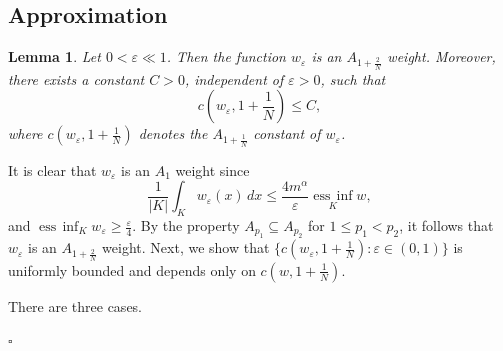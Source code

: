 \documentclass[11pt]{article}
\newtheorem{lemma}{Lemma}[section]
\newenvironment{proof}{{\bf {Proof.}}}{\hfill $\square$}
\numberwithin{equation}{section}
\def\bf{\textbf}
\def\essinf{\operatorname*{ess\ \! inf}}
\begin{document}
 \subsection{Approximation}



 \begin{lemma}\label{01.18.L1}
Let $0 < \varepsilon \ll 1$. Then the function $w_\varepsilon$ is an $A_{1+\frac{2}{N}}$ weight. Moreover, there exists a constant $C > 0$, independent of $\varepsilon > 0$, such that
\begin{equation*}
c\left(w_\varepsilon, 1+\frac{1}{N}\right) \leq C,
\end{equation*}
where $c(w_\varepsilon, 1+\frac{1}{N})$ denotes the $A_{1+\frac{1}{N}}$ constant of $w_\varepsilon$.
\end{lemma}
\begin{proof}
It is clear that $w_\varepsilon$ is an $A_1$ weight since
\begin{equation*}
\frac{1}{|K|}\int_K w_\varepsilon(x) \, dx \leq \frac{4m^\alpha}{\varepsilon} \essinf_K w,
\end{equation*}
and $\essinf_K w_\varepsilon \geq \frac{\varepsilon}{4}$. By the property $A_{p_1} \subseteq A_{p_2}$ for $1 \leq p_1 < p_2$, it follows that $w_\varepsilon$ is an $A_{1+\frac{2}{N}}$ weight.
Next, we show that $\{c(w_\varepsilon, 1+\frac{1}{N}) \colon \varepsilon \in (0,1)\}$ is uniformly bounded and depends only on $c(w,1+\frac{1}{N})$.

There are three  cases.


\end{proof}
\end{document}
